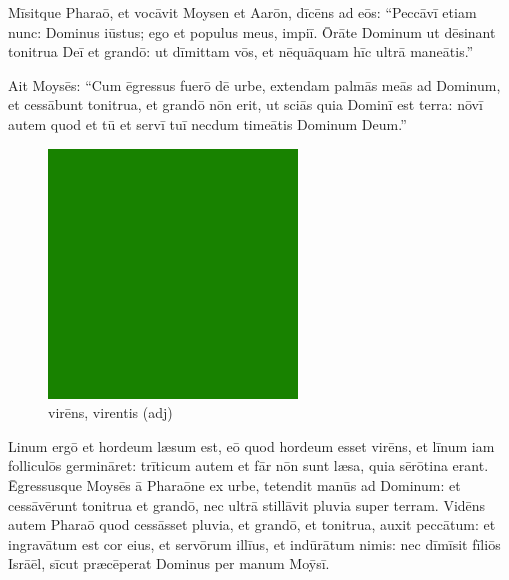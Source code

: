 Mīsitque Pharaō, et vocāvit Moysen et Aarōn,
dīcēns ad eōs: ``Peccāvī etiam nunc: Dominus iūstus; ego
et populus meus, impiī.  Ōrāte Dominum ut dēsinant
tonitrua Deī et grandō: ut dīmittam vōs, et nēquāquam hīc ultrā maneātis.''

Ait Moysēs: ``Cum ēgressus fuerō
dē urbe, extendam palmās meās ad Dominum, et cessābunt tonitrua, et grandō
nōn erit, ut sciās quia Dominī est terra: nōvī autem quod et tū et
servī tuī necdum timeātis Dominum Deum.'' 

\begin{figure}[hp]
    \centering
    \includegraphics{green}
    \caption{virēns, virentis (adj)}
\end{figure}

Linum ergō et hordeum læsum est, eō quod
hordeum esset virēns, et līnum iam
folliculōs
germināret:  trīticum autem et
fār nōn sunt læsa, quia sērōtina erant. 
Ēgressusque Moysēs ā Pharaōne ex urbe, tetendit manūs ad Dominum: et
cessāvērunt tonitrua et grandō, nec ultrā stillāvit
pluvia super terram.  Vidēns autem Pharaō quod cessāsset
pluvia, et grandō, et tonitrua, auxit peccātum:  et
ingravātum est cor eius, et servōrum illīus, et indūrātum nimis: nec
dīmīsit fīliōs Isrāēl, sīcut præcēperat Dominus
per manum Moȳsī.

